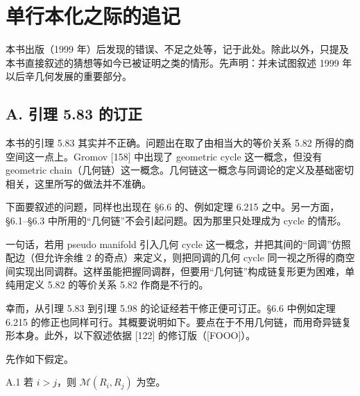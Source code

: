 
\chapter*{单行本化之际的追记}

本书出版（1999 年）后发现的错误、不足之处等，记于此处。除此以外，只提及本书直接叙述的猜想等如今已被证明之类的情形。先声明：并未试图叙述 1999 年以后辛几何发展的重要部分。

\section*{A. 引理 5.83 的订正}

本书的引理 5.83 其实并不正确。问题出在取了由相当大的等价关系 5.82 所得的商空间这一点上。Gromov [158] 中出现了 geometric cycle 这一概念，但没有 geometric chain（几何链）这一概念。几何链这一概念与同调论的定义及基础密切相关，这里所写的做法并不准确。

下面要叙述的问题，同样也出现在 §6.6 的、例如定理 6.215 之中。另一方面，§6.1–§6.3 中所用的“几何链”不会引起问题。因为那里只处理成为 cycle 的情形。

一句话，若用 pseudo manifold 引入几何 cycle 这一概念，并把其间的“同调”仿照配边（但允许余维 2 的奇点）来定义，则把同调的几何 cycle 同一视之所得的商空间实现出同调群。这样虽能把握同调群，但要用“几何链”构成链复形更为困难，单纯用定义 5.82 的等价关系 5.82 作商是不行的。


幸而，从引理 5.83 到引理 5.98 的论证经若干修正便可订正。§6.6 中例如定理 6.215 的修正也同样可行。其概要说明如下。要点在于不用几何链，而用奇异链复形本身。此外，以下叙述依据 [122] 的修订版（[FOOO]）。

先作如下假定。

\begin{assumption}{A.1}
  若 $i>j$，则 $\mathcal{M}(R_i,R_j)$ 为空。
\end{assumption}

